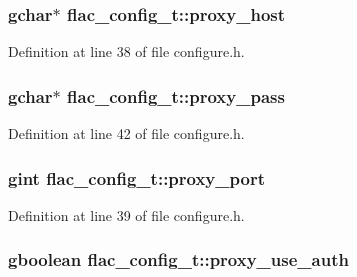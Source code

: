 \subsubsection[{\texorpdfstring{proxy\+\_\+host}{proxy_host}}]{\setlength{\rightskip}{0pt plus 5cm}gchar$\ast$ flac\+\_\+config\+\_\+t\+::proxy\+\_\+host}\hypertarget{structflac__config__t_a56f69ae6f3089f0b3cf92ebd66076c05}{}\label{structflac__config__t_a56f69ae6f3089f0b3cf92ebd66076c05}


Definition at line 38 of file configure.\+h.

\subsubsection[{\texorpdfstring{proxy\+\_\+pass}{proxy_pass}}]{\setlength{\rightskip}{0pt plus 5cm}gchar$\ast$ flac\+\_\+config\+\_\+t\+::proxy\+\_\+pass}\hypertarget{structflac__config__t_a67fd60273c0d08ded33564e08d1fa0b3}{}\label{structflac__config__t_a67fd60273c0d08ded33564e08d1fa0b3}


Definition at line 42 of file configure.\+h.

\subsubsection[{\texorpdfstring{proxy\+\_\+port}{proxy_port}}]{\setlength{\rightskip}{0pt plus 5cm}gint flac\+\_\+config\+\_\+t\+::proxy\+\_\+port}\hypertarget{structflac__config__t_ace01295391458e9f39a73f3550db07e1}{}\label{structflac__config__t_ace01295391458e9f39a73f3550db07e1}


Definition at line 39 of file configure.\+h.

\subsubsection[{\texorpdfstring{proxy\+\_\+use\+\_\+auth}{proxy_use_auth}}]{\setlength{\rightskip}{0pt plus 5cm}gboolean flac\+\_\+config\+\_\+t\+::proxy\+\_\+use\+\_\+auth}\hypertarget{structflac__config__t_ae154c4189a075f14f879f8c8ba2a4cd6}{}\label{structflac__config__t_ae154c4189a075f14f879f8c8ba2a4cd6}


